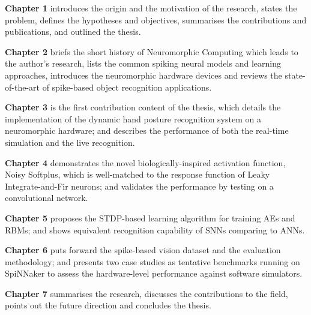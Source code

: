 \textbf{Chapter 1} introduces the origin and the motivation of the research, states the problem, defines the hypotheses and objectives, summarises the contributions and publications, and outlined the thesis. 

\textbf{Chapter 2} briefs the short history of Neuromorphic Computing which leads to the author's research, lists the common spiking neural models and learning approaches, introduces the neuromorphic hardware devices and reviews the state-of-the-art of spike-based object recognition applications. 

\textbf{Chapter 3} is the first contribution content of the thesis, which details the implementation of the dynamic hand posture recognition system on a neuromorphic hardware; and describes the performance of both the real-time simulation and the live recognition. 

\textbf{Chapter 4} demonstrates the novel biologically-inspired activation function, Noisy Softplus, which is well-matched to the response function of Leaky Integrate-and-Fir neurons; and validates the performance by testing on a convolutional network.

\textbf{Chapter 5} proposes the STDP-based learning algorithm for training AEs and RBMs; and shows equivalent recognition capability of SNNs comparing to ANNs.

\textbf{Chapter 6} puts forward the spike-based vision dataset and the evaluation methodology; and presents two case studies as tentative benchmarks running on SpiNNaker to assess the hardware-level performance against software simulators.

\textbf{Chapter 7} summarises the research, discusses the contributions to the field, points out the future direction and concludes the thesis.



